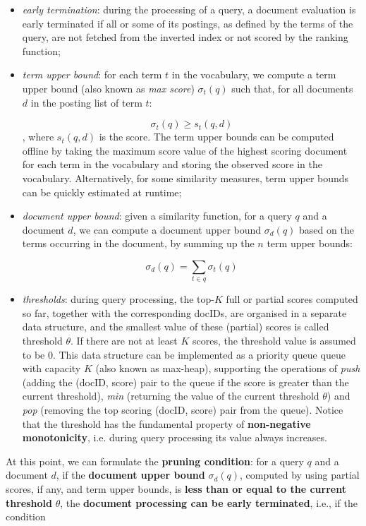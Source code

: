 \begin{itemize}
    \item \textit{early termination}: during the processing of a query, a document evaluation is early terminated if all or some of its postings, as defined by the terms of the query, are not fetched from the inverted index or not scored by the ranking function;
    \item \textit{term upper bound}: for each term $t$ in the vocabulary, we compute a term upper bound (also known as \textit{max score}) $\sigma_t(q)$ such that, for all documents $d$ in the posting list of term $t$:
    
    $$
    \sigma_t(q) \geq s_t(q, d)
    $$
    , where $s_t(q, d)$ is the score. The term upper bounds can be computed offline by taking the maximum score value of the highest scoring document for each term in the vocabulary and storing the observed score in the vocabulary. Alternatively, for some similarity measures, term upper bounds can be quickly estimated at runtime;
    \item \textit{document upper bound}: given a similarity function, for a query $q$ and a document $d$, we can compute a document upper bound $\sigma_d(q)$ based on the terms occurring in the document, by summing up the $n$ term upper bounds:

    $$
    \sigma_d(q) = \sum_{t \in q} \sigma_t(q)
    $$

    \item \textit{thresholds}: during query processing, the top-$K$ full or partial scores computed so far, together with the corresponding docIDs, are organised in a separate data structure, and the smallest value of these (partial) scores is called threshold $\theta$. If there are not at least $K$ scores, the threshold value is assumed to be 0. This data structure can be implemented as a priority queue queue with capacity $K$ (also known as max-heap), supporting the operations of \textit{push} (adding the (docID, score) pair to the queue if the score is greater than the current threshold), \textit{min} (returning the value of the current threshold $\theta$) and \textit{pop} (removing the top scoring (docID, score) pair from the queue). Notice that the threshold has the fundamental property of \textbf{non-negative monotonicity}, i.e. during query processing its value always increases.
    
\end{itemize}

At this point, we can formulate the \textbf{pruning condition}: for a query $q$ and a document $d$, if the \textbf{document upper bound} $\sigma_d(q)$, computed by using partial scores, if any, and term upper bounds, is \textbf{less than or equal to the current threshold} $\theta$, the \textbf{document processing can be early terminated}, i.e., if the condition


